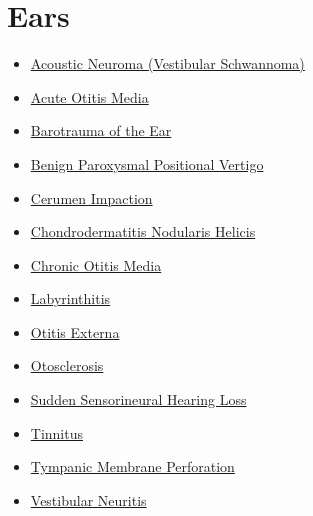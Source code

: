 \section*{Ears}
\label{sec:organ_ears}
\begin{itemize}[noitemsep]
  \item \hyperlink{sec:Acoustic Neuroma (Vestibular Schwannoma)}{Acoustic Neuroma (Vestibular Schwannoma)}
  \item \hyperlink{sec:Acute Otitis Media}{Acute Otitis Media}
  \item \hyperlink{sec:Barotrauma of the Ear}{Barotrauma of the Ear}
  \item \hyperlink{sec:Benign Paroxysmal Positional Vertigo}{Benign Paroxysmal Positional Vertigo}
  \item \hyperlink{sec:Cerumen Impaction}{Cerumen Impaction}
  \item \hyperlink{sec:Chondrodermatitis Nodularis Helicis}{Chondrodermatitis Nodularis Helicis}
  \item \hyperlink{sec:Chronic Otitis Media}{Chronic Otitis Media}
  \item \hyperlink{sec:Labyrinthitis}{Labyrinthitis}
  \item \hyperlink{sec:Otitis Externa}{Otitis Externa}
  \item \hyperlink{sec:Otosclerosis}{Otosclerosis}
  \item \hyperlink{sec:Sudden Sensorineural Hearing Loss}{Sudden Sensorineural Hearing Loss}
  \item \hyperlink{sec:Tinnitus}{Tinnitus}
  \item \hyperlink{sec:Tympanic Membrane Perforation}{Tympanic Membrane Perforation}
  \item \hyperlink{sec:Vestibular Neuritis}{Vestibular Neuritis}
\end{itemize}


